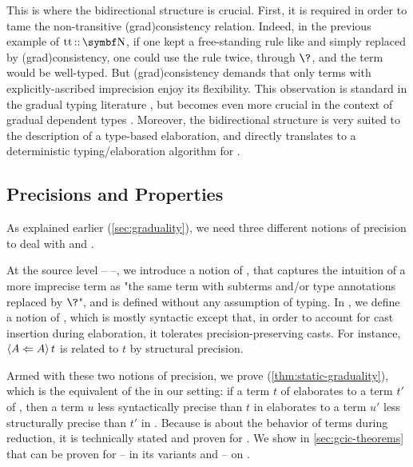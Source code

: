 This is where the bidirectional structure is crucial.
First, it is required in order to tame the non-transitive \kl(grad){consistency} relation.
Indeed, in the previous example of $\asc{\true}{\Nat}$, if one kept a free-standing rule like
 and simply replaced  by \kl(grad){consistency}, one could
use the rule twice, through $\?$, and the term would be well-typed.
But \kl(grad){consistency} demands that only terms with explicitly-ascribed
imprecision enjoy its flexibility.
This observation is standard in the gradual typing literature
, but becomes even more crucial in the context of
gradual dependent types .
Moreover, the bidirectional structure is very suited to the description of
a type-based elaboration, and directly translates to a deterministic typing/elaboration
algorithm for .

\subsection{Precisions and Properties}
\label{sec:precision-graduality}

As explained earlier (\cref{sec:graduality}), we need three different notions of
precision to deal with  and .

At the source level –  –,
we introduce a notion of , that captures the
intuition of a more imprecise term as "the same term with subterms and/or
type annotations replaced by $\?$", and is defined without any assumption of typing.
In , we define a notion of ,
which is mostly syntactic except that, in order to account for cast insertion during elaboration, it tolerates precision-preserving casts.
For instance, $\castrev{t}{A}{A}$ is related to $t$ by structural precision.

Armed with these two notions of precision, we prove
 (\cref{thm:static-graduality}), which is
the equivalent of the  in our setting:
if a term $t$ of  elaborates to a term $t'$ of ,
then a term $u$ less syntactically precise than $t$ in  elaborates to
a term $u'$ less structurally precise than $t'$ in .
%
Because  is about the behavior of terms during reduction,
it is technically stated and proven for .
We show in \cref{sec:gcic-theorems} that  can be proven
for  – in its variants  and  – on .

